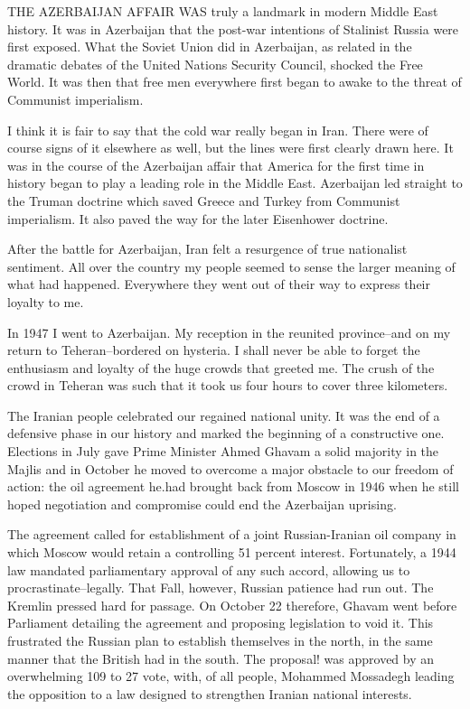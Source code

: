 THE AZERBAIJAN AFFAIR WAS truly a landmark in modern Middle East history. It was in Azerbaijan that the post-war intentions of Stalinist Russia were first exposed. What the Soviet Union did in Azerbaijan, as related in the dramatic debates of the United Nations Security Council, shocked the Free World. It was then that free men everywhere first began to awake to the threat of Communist imperialism. 

I think it is fair to say that the cold war really began in Iran. There were of course signs of it elsewhere as well, but the lines were first clearly drawn here. It was in the course of the Azerbaijan affair that America for the first time in history began to play a leading role in the Middle East. Azerbaijan led straight to the Truman doctrine which saved Greece and Turkey from Communist imperialism. It also paved the way for the later Eisenhower doctrine. 

After the battle for Azerbaijan, Iran felt a resurgence of true nationalist sentiment. All over the country my people seemed to sense the larger meaning of what had happened. Everywhere they went out of their way to express their loyalty to me. 

In 1947 I went to Azerbaijan. My reception in the reunited province--and on my return to Teheran--bordered on hysteria. I shall never be able to forget the enthusiasm and loyalty of the huge crowds that greeted me. The crush of the crowd in Teheran was such that it took us four hours to cover three kilometers. 

The Iranian people celebrated our regained national unity. It was the end of a defensive phase in our history and marked the beginning of a constructive one. Elections in July gave Prime Minister Ahmed Ghavam a solid majority in the Majlis and in October he moved to overcome a major obstacle to our freedom of action: the oil agreement he.had brought back from Moscow in 1946 when he still hoped negotiation and compromise could end the Azerbaijan uprising. 

The agreement called for establishment of a joint Russian-Iranian oil company in which Moscow would retain a controlling 51 percent interest. Fortunately, a 1944 law mandated parliamentary approval of any such accord, allowing us to procrastinate--legally. That Fall, however, Russian patience had run out. The Kremlin pressed hard for passage. On October 22 therefore, Ghavam went before Parliament detailing the agreement and proposing legislation to void it. This frustrated the Russian plan to establish themselves in the north, in the same manner that the British had in the south. The proposal! was approved by an overwhelming 109 to 27 vote, with, of all people, Mohammed Mossadegh leading the opposition to a law designed to strengthen Iranian national interests. 

